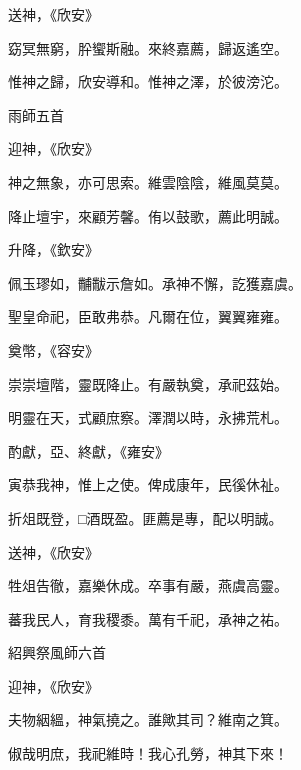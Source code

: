 \begin{pinyinscope}
 送神，《欣安》



 窈冥無窮，肸蠁斯融。來終嘉薦，歸返遙空。



 惟神之歸，欣安導和。惟神之澤，於彼滂沱。



 雨師五首



 迎神，《欣安》



 神之無象，亦可思索。維雲陰陰，維風莫莫。



 降止壇宇，來顧芳馨。侑以鼓歌，薦此明誠。



 升降，《欽安》



 佩玉璆如，黼黻示詹如。承神不懈，訖獲嘉虞。



 聖皇命祀，臣敢弗恭。凡爾在位，翼翼雍雍。



 奠幣，《容安》



 崇崇壇階，靈既降止。有嚴執奠，承祀茲始。



 明靈在天，式顧庶察。澤潤以時，永拂荒札。



 酌獻，亞、終獻，《雍安》



 寅恭我神，惟上之使。俾成康年，民徯休祉。



 折俎既登，□酒既盈。匪薦是專，配以明誠。



 送神，《欣安》



 牲俎告徹，嘉樂休成。卒事有嚴，燕虞高靈。



 蕃我民人，育我稷黍。萬有千祀，承神之祐。



 紹興祭風師六首



 迎神，《欣安》



 夫物絪縕，神氣撓之。誰歟其司？維南之箕。



 俶哉明庶，我祀維時！我心孔勞，神其下來！




\end{pinyinscope}
